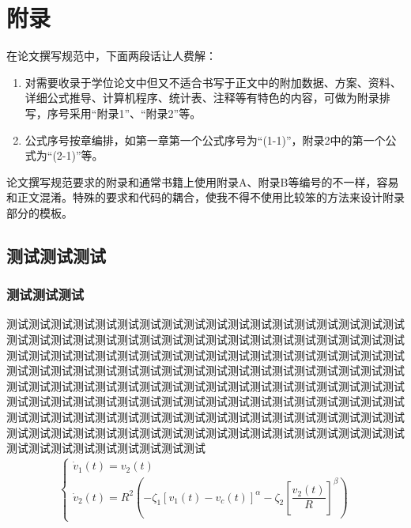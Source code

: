 \setcounter{chapter}{1} %
\setcounter{section}{0}
\setcounter{equation}{0}
\setcounter{table}{0}   
\setcounter{figure}{0}
\chapter{附\texorpdfstring{\quad}{}录} %


在论文撰写规范中，下面两段话让人费解：

\begin{enumerate}
	\item 	对需要收录于学位论文中但又不适合书写于正文中的附加数据、方案、资料、详细公式推导、计算机程序、统计表、注释等有特色的内容，可做为附录排写，序号采用“附录1”、“附录2”等。	
	\item	公式序号按章编排，如第一章第一个公式序号为“(1-1)”，附录2中的第一个公式为“(2-1)”等。
\end{enumerate}

论文撰写规范要求的附录和通常书籍上使用附录A、附录B等编号的不一样，容易和正文混淆。特殊的要求和代码的耦合，使我不得不使用比较笨的方法来设计附录部分的模板。

\section{测试测试测试}
\subsection{测试测试测试}
%
测试测试测试测试测试测试测试测试测试测试测试测试测试测试测试测试测试测试测试测试测试测试测试测试测试测试测试测试测试测试测试测试测试测试测试测试测试测试测试测试测试测试测试测试测试测试测试测试测试测试测试测试测试测试测试测试测试测试测试测试测试测试测试测试测试测试测试测试测试测试测试测试测试测试测试测试测试测试测试测试测试测试测试测试测试测试测试测试测试测试测试测试测试测试测试测试测试测试测试测试测试测试测试测试测试测试测试测试测试测试测试测试测试测试测试测试测试测试测试测试测试测试测试测试测试测试测试测试测试测试测试测试测试测试测试测试测试测试测试测试测试测试测试测试测试测试测试测试测试测试测试测试测试
\begin{align}
\left\{\begin{array}{l}
\dot{v}_{1}(t)=v_{2}(t) \\
\dot{v}_{2}(t)=R^{2}\left(-\zeta_{1}\left[v_{1}(t)-v_c(t)\right]^{\alpha}-\zeta_{2}\left[\dfrac{v_{2}(t)}{R}\right]^{\beta}\right)
\end{array}\right.	
\end{align}


